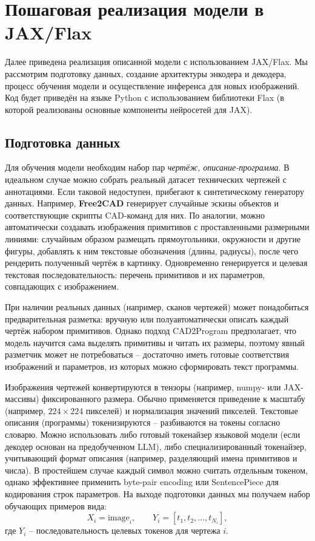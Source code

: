 \documentclass{article}
\begin{document}
\section{Пошаговая реализация модели в JAX/Flax}

Далее приведена реализация описанной модели с использованием JAX/Flax. Мы рассмотрим подготовку данных, создание архитектуры энкодера и декодера, процесс обучения модели и осуществление инференса для новых изображений. Код будет приведён на языке Python с использованием библиотеки Flax (в которой реализованы основные компоненты нейросетей для JAX).

\subsection{Подготовка данных}

Для обучения модели необходим набор пар {\textit{чертёж, описание-программа}}. В идеальном случае можно собрать реальный датасет технических чертежей с аннотациями. Если таковой недоступен, прибегают к синтетическому генератору данных. Например, \textbf{Free2CAD} генерирует случайные эскизы объектов и соответствующие скрипты CAD-команд для них. По аналогии, можно автоматически создавать изображения примитивов с проставленными размерными линиями: случайным образом размещать прямоугольники, окружности и другие фигуры, добавлять к ним текстовые обозначения (длины, радиусы), после чего рендерить полученный чертёж в картинку. Одновременно генерируется и целевая текстовая последовательность: перечень примитивов и их параметров, совпадающих с изображением.

При наличии реальных данных (например, сканов чертежей) может понадобиться предварительная разметка: вручную или полуавтоматически описать каждый чертёж набором примитивов. Однако подход CAD2Program предполагает, что модель научится сама выделять примитивы и читать их размеры, поэтому явный разметчик может не потребоваться – достаточно иметь готовые соответствия изображений и параметров, из которых можно сформировать текст программы.

Изображения чертежей конвертируются в тензоры (например, numpy- или JAX-массивы) фиксированного размера. Обычно применяется приведение к масштабу (например, $224\times224$ пикселей) и нормализация значений пикселей. Текстовые описания (программы) токенизируются – разбиваются на токены согласно словарю. Можно использовать либо готовый токенайзер языковой модели (если декодер основан на предобученном LLM), либо специализированный токенайзер, учитывающий формат описания (например, разделяющий имена примитивов и числа). В простейшем случае каждый символ можно считать отдельным токеном, однако эффективнее применить byte-pair encoding или SentencePiece для кодирования строк параметров. На выходе подготовки данных мы получаем набор обучающих примеров вида:
$$X_i = \text{image}_i,\qquad Y_i = [t_1, t_2, \dots, t_{N_i}],$$
где $Y_i$ – последовательность целевых токенов для чертежа $i$.
\end{document}

